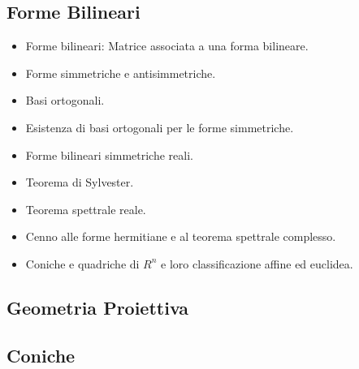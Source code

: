 \documentclass[a4paper,10pt]{article}
\begin{document}
\subsection*{Forme Bilineari}
  \begin{itemize}
   \item Forme bilineari: Matrice associata a una forma bilineare. 
   \item Forme simmetriche e antisimmetriche. 
   \item Basi ortogonali. 
   \item Esistenza di basi ortogonali per le forme simmetriche. 
   \item Forme bilineari simmetriche reali. 
   \item Teorema di Sylvester. 
   \item Teorema spettrale reale. 
   \item Cenno alle forme hermitiane e al teorema spettrale complesso.  
   \item Coniche e quadriche di $R^n$ e loro classificazione affine ed euclidea.
  \end{itemize}
  
\subsection*{Geometria Proiettiva}

\subsection*{Coniche}  
  
\end{document}
